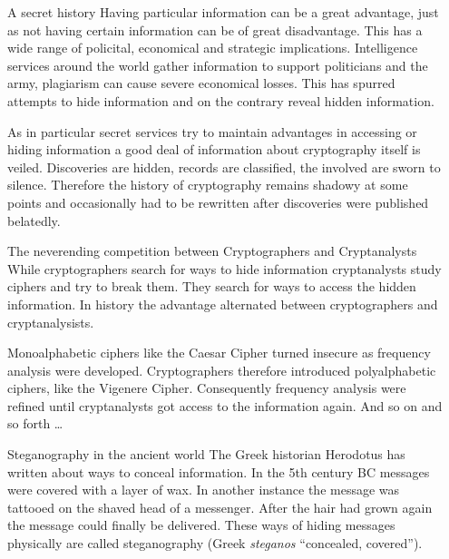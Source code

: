 \documentclass[final,hyperref={pdfpagelabels=false}]{beamer}
\begin{document}
\begin{frame}{}
    \begin{columns}[t]
    \begin{column}{.3\linewidth}
    \begin{block}{A secret history}
      Having particular information can be a great advantage, just as not having certain information can be of great disadvantage. This has a wide range of policital, economical and strategic implications. Intelligence services around the world gather information to support politicians and the army, plagiarism can cause severe economical losses. This has spurred attempts to hide information and on the contrary reveal hidden information. \par
      As in particular secret services try to maintain advantages in accessing or hiding information a good deal of information about cryptography itself is veiled. Discoveries are hidden, records are classified, the involved are sworn to silence. Therefore the history of cryptography remains shadowy at some points and occasionally had to be rewritten after discoveries were published belatedly.
    \end{block}
      \begin{block}{The neverending competition between Cryptographers and Cryptanalysts}
        While cryptographers search for ways to hide information cryptanalysts study ciphers and try to break them. They search for ways to access the hidden information. In history the advantage alternated between cryptographers and cryptanalysists. 
        \par Monoalphabetic ciphers like the Caesar Cipher turned insecure as frequency analysis were developed. Cryptographers therefore introduced polyalphabetic ciphers, like the Vigenere Cipher. Consequently frequency analysis were refined until cryptanalysts got access to the information again. And so on and so forth \ldots 
      \end{block}
        \begin{block}{Steganography in the ancient world}
          The Greek historian Herodotus has written about ways to conceal information. In the 5th century BC messages were covered with a layer of wax. In another instance the message was tattooed on the shaved head of a messenger. After the hair had grown again the message could finally be delivered. These ways of hiding messages physically are called steganography (Greek {\it steganos} ``concealed, covered'').
        \end{block}
    \end{column}
    \begin{column}{.3\linewidth}

\end{column}
\end{columns}
\end{frame}
\end{document}
